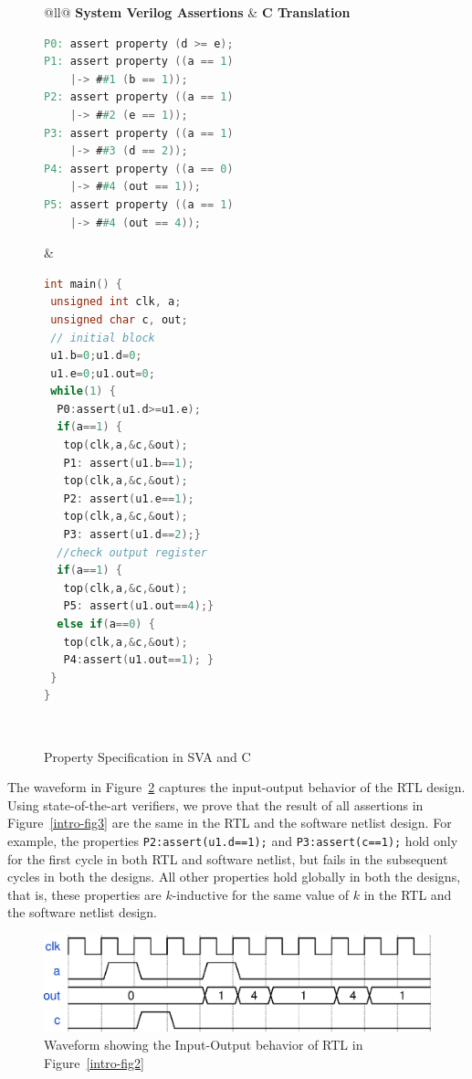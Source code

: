 \begin{figure}[bth]
\small
\begin{center}
\begin{tabular}{@{}ll@{}}
\hline\noalign{\vskip0.25ex}
\textbf{System Verilog Assertions} & \textbf{C Translation} \\
\hline
\begin{lstlisting}[mathescape=true,language=Verilog,basicstyle=\scriptsize\ttfamily]
P0: assert property (d >= e);
P1: assert property ((a == 1) 
    |-> ##1 (b == 1));
P2: assert property ((a == 1) 
    |-> ##2 (e == 1));
P3: assert property ((a == 1) 
    |-> ##3 (d == 2));
P4: assert property ((a == 0) 
    |-> ##4 (out == 1));
P5: assert property ((a == 1) 
    |-> ##4 (out == 4));
\end{lstlisting}
&
\begin{lstlisting}[mathescape=true,language=C,basicstyle=\scriptsize\ttfamily]
int main() {
 unsigned int clk, a;
 unsigned char c, out;
 // initial block
 u1.b=0;u1.d=0;
 u1.e=0;u1.out=0;
 while(1) {
  P0:assert(u1.d>=u1.e);
  if(a==1) { 
   top(clk,a,&c,&out);
   P1: assert(u1.b==1);
   top(clk,a,&c,&out);
   P2: assert(u1.e==1);
   top(clk,a,&c,&out);
   P3: assert(u1.d==2);}
  //check output register
  if(a==1) {
   top(clk,a,&c,&out);
   P5: assert(u1.out==4);}
  else if(a==0) {
   top(clk,a,&c,&out);
   P4:assert(u1.out==1); } 
 }
}
\end{lstlisting}\\
\hline
\end{tabular}
	\caption{Property Specification in SVA and C}
\label{fig:sva}
\end{center}
\end{figure}

The waveform in Figure~\ref{intro-waveform} captures the input-output behavior of the RTL design. 
Using state-of-the-art verifiers, we prove that the result of all assertions 
in Figure~\ref{intro-fig3} are the same in the RTL and the software netlist design. 
%
For example, the properties \texttt{P2:assert(u1.d==1);} and \texttt{P3:assert(c==1);} 
hold only for the first cycle in both RTL and software netlist, but fails in the 
subsequent cycles in both the designs.  All other properties 
hold globally in both the designs, that is, these properties are $k$-inductive 
for the same value of $k$ in the RTL and the software netlist design.
%
\begin{figure} 
\begin{center}
  \includegraphics[width=\columnwidth]{figures/example/waveform1.eps}%
	\caption{Waveform showing the Input-Output behavior of RTL in Figure~\ref{intro-fig2}}
\label{intro-waveform}
\end{center}
\end{figure}
%

